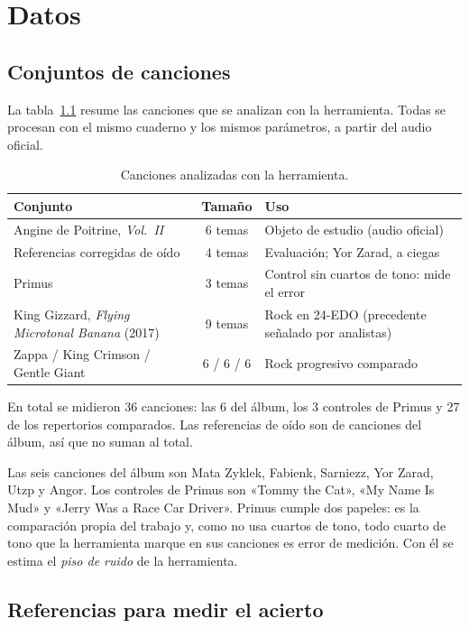 \chapter{Datos}\label{cap:datos}

\section{Conjuntos de canciones}

La tabla~\ref{tab:conjuntos} resume las canciones que se analizan con la herramienta. Todas se procesan con el mismo
cuaderno y los mismos parámetros, a partir del audio oficial.

\begin{table}[ht]
  \centering
  \caption{Canciones analizadas con la herramienta.}\label{tab:conjuntos}
  \begin{tabularx}{\textwidth}{@{}>{\raggedright}p{6.2cm}c>{\raggedright\arraybackslash}X@{}}
    \toprule
    Conjunto & Tamaño & Uso \\
    \midrule
    Angine de Poitrine, \emph{Vol.~II} & 6 temas & Objeto de estudio (audio oficial) \\
    Referencias corregidas de oído & 4 temas & Evaluación; Yor Zarad, a ciegas \\
    Primus & 3 temas & Control sin cuartos de tono: mide el error \\
    King Gizzard, \emph{Flying Microtonal Banana} (2017) & 9 temas & Rock en 24-EDO (precedente señalado por analistas) \\
    Zappa / King Crimson / Gentle Giant & 6 / 6 / 6 & Rock progresivo comparado \\
    \bottomrule
  \end{tabularx}
\end{table}

En total se midieron 36 canciones: las 6 del álbum, los 3 controles de Primus y 27 de los repertorios comparados. Las
referencias de oído son de canciones del álbum, así que no suman al total.

Las seis canciones del álbum son Mata Zyklek, Fabienk, Sarniezz, Yor Zarad, Utzp y Angor. Los controles de Primus son
«Tommy the Cat», «My Name Is Mud» y «Jerry Was a Race Car Driver». Primus cumple dos papeles: es la comparación propia
del trabajo y, como no usa cuartos de tono, todo cuarto de tono que la herramienta marque en sus canciones es error de
medición. Con él se estima el \emph{piso de ruido} de la herramienta.

\section{Referencias para medir el acierto}\label{sec:referencias}

